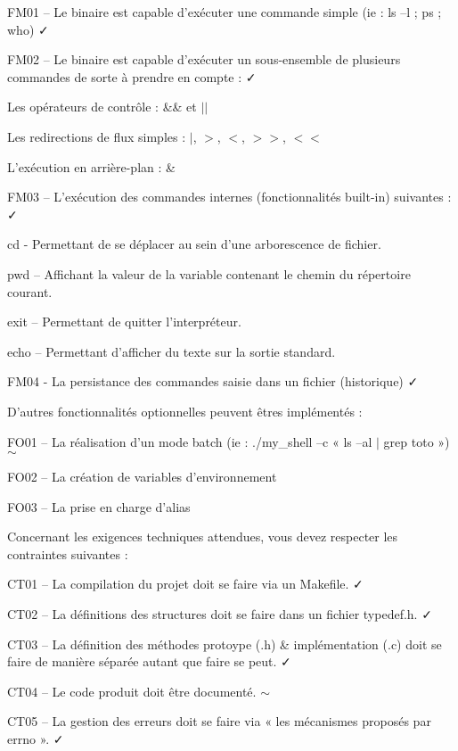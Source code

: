 \begin{DoxyItemize}
\item F\+M01 – Le binaire est capable d’exécuter une commande simple (ie \+: ls –l ; ps ; who) ✓
\item F\+M02 – Le binaire est capable d’exécuter un sous-\/ensemble de plusieurs commandes de sorte à prendre en compte \+: ✓
\begin{DoxyItemize}
\item Les opérateurs de contrôle \+: \&\& et $\vert$$\vert$
\item Les redirections de flux simples \+: $\vert$, $>$, $<$, $>$$>$, $<$$<$
\item L’exécution en arrière-\/plan \+: \&
\end{DoxyItemize}
\item F\+M03 – L’exécution des commandes internes (fonctionnalités built-\/in) suivantes \+: ✓
\begin{DoxyItemize}
\item cd -\/ Permettant de se déplacer au sein d’une arborescence de fichier.
\item pwd – Affichant la valeur de la variable contenant le chemin du répertoire courant.
\item exit – Permettant de quitter l’interpréteur.
\item echo – Permettant d’afficher du texte sur la sortie standard.
\end{DoxyItemize}
\item F\+M04 -\/ La persistance des commandes saisie dans un fichier (historique) ✓
\end{DoxyItemize}

D’autres fonctionnalités optionnelles peuvent êtres implémentés \+:


\begin{DoxyItemize}
\item F\+O01 – La réalisation d’un mode batch (ie \+: ./my\+\_\+shell –c « ls –al $\vert$ grep toto ») $\sim$
\item F\+O02 – La création de variables d’environnement
\item F\+O03 – La prise en charge d’alias
\end{DoxyItemize}

Concernant les exigences techniques attendues, vous devez respecter les contraintes suivantes \+:


\begin{DoxyItemize}
\item C\+T01 – La compilation du projet doit se faire via un Makefile. ✓
\item C\+T02 – La définitions des structures doit se faire dans un fichier typedef.\+h. ✓
\item C\+T03 – La définition des méthodes protoype (.h) \& implémentation (.c) doit se faire de manière séparée autant que faire se peut. ✓
\item C\+T04 – Le code produit doit être documenté. $\sim$
\item C\+T05 – La gestion des erreurs doit se faire via « les mécanismes proposés par errno ». ✓
\end{DoxyItemize}

